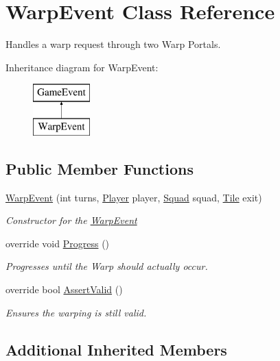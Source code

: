 \hypertarget{class_warp_event}{}\section{Warp\+Event Class Reference}
\label{class_warp_event}


Handles a warp request through two Warp Portals.  


Inheritance diagram for Warp\+Event\+:\begin{figure}[H]
\begin{center}
\leavevmode
\includegraphics[height=2.000000cm]{class_warp_event}
\end{center}
\end{figure}
\subsection*{Public Member Functions}
\begin{DoxyCompactItemize}
\item 
\hyperlink{class_warp_event_a61693f10c53b80bb32e80ae95cac00a5}{Warp\+Event} (int turns, \hyperlink{class_player}{Player} player, \hyperlink{class_squad}{Squad} squad, \hyperlink{class_tile}{Tile} exit)
\begin{DoxyCompactList}\small\item\em Constructor for the \hyperlink{class_warp_event}{Warp\+Event} \end{DoxyCompactList}\item 
override void \hyperlink{class_warp_event_a04806691764296e3907f9f78ede040cc}{Progress} ()
\begin{DoxyCompactList}\small\item\em Progresses until the Warp should actually occur. \end{DoxyCompactList}\item 
override bool \hyperlink{class_warp_event_ace9d3145103ab72a68f75308b1de57ce}{Assert\+Valid} ()
\begin{DoxyCompactList}\small\item\em Ensures the warping is still valid. \end{DoxyCompactList}\end{DoxyCompactItemize}
\subsection*{Additional Inherited Members}


